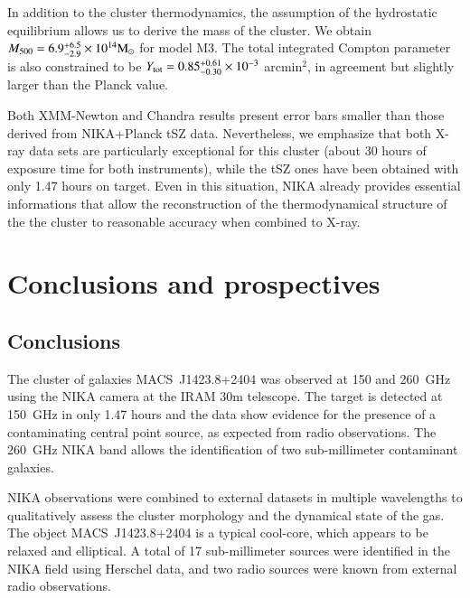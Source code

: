 \documentclass[twocolumn,traditabstract]{aa}
\begin{document}
In addition to the cluster thermodynamics, the assumption of the hydrostatic equilibrium allows us to derive the mass of the cluster. We obtain $M_{500} = 6.9^{+6.5}_{-2.9}  \times 10^{14} {\rm M}_{\odot}$ for model M3. The total integrated Compton parameter is also constrained to be $Y_{\rm tot} = 0.85^{+0.61}_{-0.30} \times 10^{-3}$ arcmin$^2$, in agreement but slightly larger than the Planck value.

Both XMM-Newton and Chandra results present error bars smaller than those derived from NIKA+Planck tSZ data. Nevertheless, we emphasize that both X-ray data sets are particularly exceptional for this cluster (about 30 hours of exposure time for both instruments), while the tSZ ones have been obtained with only 1.47 hours on target. Even in this situation, NIKA already provides essential informations that allow the reconstruction of the thermodynamical structure of the the cluster to reasonable accuracy when combined to X-ray.

\section{Conclusions and prospectives}\label{sec:conclusions}
\subsection{Conclusions}
The cluster of galaxies \mbox{MACS~J1423.8+2404} was observed at 150 and 260~GHz using the NIKA camera at the IRAM 30m telescope. The target is detected at 150~GHz in only 1.47 hours and the data show evidence for the presence of a contaminating central point source, as expected from radio observations. The 260~GHz NIKA band allows the identification of two sub-millimeter contaminant galaxies.

NIKA observations were combined to external datasets in multiple wavelengths to qualitatively assess the cluster morphology and the dynamical state of the gas. The object \mbox{MACS~J1423.8+2404} is a typical cool-core, which appears to be relaxed and elliptical. A total of 17 sub-millimeter sources were identified in the NIKA field using Herschel data, and two radio sources were known from external radio observations.
\end{document}

